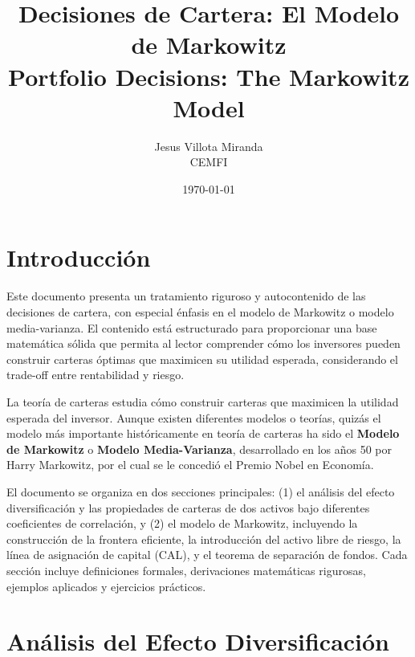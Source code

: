 

\title{\textbf{Decisiones de Cartera: El Modelo de Markowitz}\\
\large Portfolio Decisions: The Markowitz Model}
\author{Jesus Villota Miranda\\
CEMFI}
\date{\today}



\maketitle

\tableofcontents
\newpage

\section{Introducción}

Este documento presenta un tratamiento riguroso y autocontenido de las decisiones de cartera, con especial énfasis en el modelo de Markowitz o modelo media-varianza. El contenido está estructurado para proporcionar una base matemática sólida que permita al lector comprender cómo los inversores pueden construir carteras óptimas que maximicen su utilidad esperada, considerando el trade-off entre rentabilidad y riesgo.

La teoría de carteras estudia cómo construir carteras que maximicen la utilidad esperada del inversor. Aunque existen diferentes modelos o teorías, quizás el modelo más importante históricamente en teoría de carteras ha sido el \textbf{Modelo de Markowitz} o \textbf{Modelo Media-Varianza}, desarrollado en los años 50 por Harry Markowitz, por el cual se le concedió el Premio Nobel en Economía.

El documento se organiza en dos secciones principales: (1) el análisis del efecto diversificación y las propiedades de carteras de dos activos bajo diferentes coeficientes de correlación, y (2) el modelo de Markowitz, incluyendo la construcción de la frontera eficiente, la introducción del activo libre de riesgo, la línea de asignación de capital (CAL), y el teorema de separación de fondos. Cada sección incluye definiciones formales, derivaciones matemáticas rigurosas, ejemplos aplicados y ejercicios prácticos.

\section{Análisis del Efecto Diversificación}

